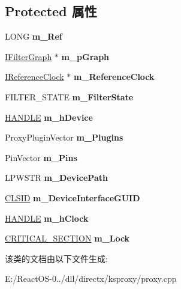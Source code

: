 \subsection*{Protected 属性}
\begin{DoxyCompactItemize}
\item 
\mbox{\label{class_c_ks_proxy_a861e29713bfbb8ff892799a82de6fc9c}} 
L\+O\+NG {\bfseries m\+\_\+\+Ref}
\item 
\mbox{\label{class_c_ks_proxy_a5e29831abeaf616a45669dd10124108d}} 
\hyperlink{interface_i_filter_graph}{I\+Filter\+Graph} $\ast$ {\bfseries m\+\_\+p\+Graph}
\item 
\mbox{\label{class_c_ks_proxy_a20ce85f83bd92c2e17d1d6d525000a4e}} 
\hyperlink{interface_i_reference_clock}{I\+Reference\+Clock} $\ast$ {\bfseries m\+\_\+\+Reference\+Clock}
\item 
\mbox{\label{class_c_ks_proxy_a4794ef1b883c995d6d60b135b991bc84}} 
F\+I\+L\+T\+E\+R\+\_\+\+S\+T\+A\+TE {\bfseries m\+\_\+\+Filter\+State}
\item 
\mbox{\label{class_c_ks_proxy_a572ca134f8a7fe6473cbe8b422b4ccbe}} 
\hyperlink{interfacevoid}{H\+A\+N\+D\+LE} {\bfseries m\+\_\+h\+Device}
\item 
\mbox{\label{class_c_ks_proxy_a5af065ebae74d8f1367e74f33209c117}} 
Proxy\+Plugin\+Vector {\bfseries m\+\_\+\+Plugins}
\item 
\mbox{\label{class_c_ks_proxy_a5bfb88ea90d4c9f717aac5b465f69d95}} 
Pin\+Vector {\bfseries m\+\_\+\+Pins}
\item 
\mbox{\label{class_c_ks_proxy_a9cc3f9a0bacde2062313932524e9827d}} 
L\+P\+W\+S\+TR {\bfseries m\+\_\+\+Device\+Path}
\item 
\mbox{\label{class_c_ks_proxy_a15fc720291ecbdce3d62e090389341a4}} 
\hyperlink{struct___i_i_d}{C\+L\+S\+ID} {\bfseries m\+\_\+\+Device\+Interface\+G\+U\+ID}
\item 
\mbox{\label{class_c_ks_proxy_a59a8201131858364ce408cf7d042a5ee}} 
\hyperlink{interfacevoid}{H\+A\+N\+D\+LE} {\bfseries m\+\_\+h\+Clock}
\item 
\mbox{\label{class_c_ks_proxy_abab50ee6c084be493d40f30cfd09f9ec}} 
\hyperlink{struct___c_r_i_t_i_c_a_l___s_e_c_t_i_o_n}{C\+R\+I\+T\+I\+C\+A\+L\+\_\+\+S\+E\+C\+T\+I\+ON} {\bfseries m\+\_\+\+Lock}
\end{DoxyCompactItemize}


该类的文档由以下文件生成\+:\begin{DoxyCompactItemize}
\item 
E\+:/\+React\+O\+S-\/0../dll/directx/ksproxy/proxy.\+cpp\end{DoxyCompactItemize}
